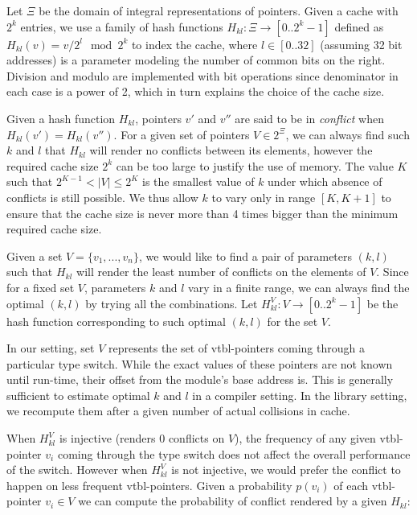 Let $\Xi$ be the domain of integral representations of pointers. Given a cache 
with $2^k$ entries, we use a family of hash functions $H_{kl} : \Xi \rightarrow [0..2^k-1]$ 
defined as $H_{kl}(v)=v/2^l \mod 2^k$ to index the cache, where $l \in [0..32]$ 
(assuming 32 bit addresses) is a parameter modeling the number of common bits on 
the right. Division and modulo are implemented with bit operations since 
denominator in each case is a power of 2, which in turn explains the choice of 
the cache size.

Given a hash function $H_{kl}$, pointers $v'$ and $v''$ are said to be in 
\emph{conflict} when $H_{kl}(v')=H_{kl}(v'')$. For a given set of pointers 
$V \in 2^{\Xi}$, we can always find such $k$ and $l$ that $H_{kl}$ will render no  
conflicts between its elements, however the required cache size $2^k$ can be too 
large to justify the use of memory. The value $K$ such that $2^{K-1} < |V| \leq 2^K$ 
is the smallest value of $k$ under which absence of conflicts is still possible. 
We thus allow $k$ to vary only in range $[K,K+1]$ to ensure that the cache size 
is never more than 4 times bigger than the minimum required cache size.

Given a set $V = \{v_1, ... , v_n\}$, we would like to find a pair of parameters 
$(k,l)$ such that $H_{kl}$ will render the least number of conflicts on the 
elements of $V$. Since for a fixed set $V$, parameters $k$ and $l$ vary in a 
finite range, we can always find the optimal $(k,l)$ by trying all the
combinations. Let $H_{kl}^V : V \rightarrow [0..2^k-1]$ be the hash function 
corresponding to such optimal $(k,l)$ for the set $V$. 

In our setting, set $V$ represents the set of vtbl-pointers coming through a 
particular type switch. While the exact values of these pointers are not known 
until run-time, their offset from the module's base address is. This is generally 
sufficient to estimate optimal $k$ and $l$ in a compiler setting. In the library 
setting, we recompute them after a given number of actual collisions in cache.

When $H_{kl}^V$ is injective (renders 0 conflicts on $V$), the frequency of any 
given vtbl-pointer $v_i$ coming through the type switch does not affect the 
overall performance of the switch. However when $H_{kl}^V$ is not injective, we 
would prefer the conflict to happen on less frequent vtbl-pointers.
Given a probability $p(v_i)$ of each vtbl-pointer $v_i \in V$ we can compute the 
probability of conflict rendered by a given $H_{kl}$:

